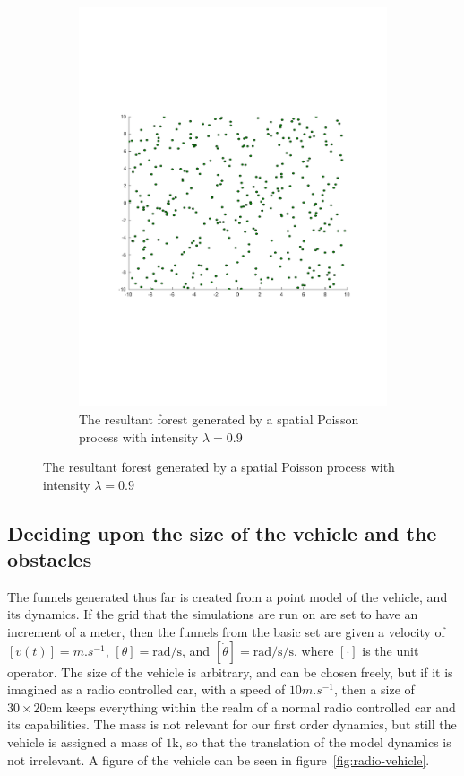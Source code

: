 \begin{figure}
\begin{subfigure}[b]{0.5\textwidth}
    \includegraphics[width=\textwidth]{figures/experiments/poisson09}
    \caption{The resultant forest generated by a spatial Poisson process with
      intensity \(\lambda = 0.9\)}
    \label{fig:poisson09}
  \end{subfigure}
\end{figure}

\subsection{Deciding upon the size of the vehicle and the obstacles}

The funnels generated thus far is created from a point model of the vehicle, and
its dynamics. If the grid that the simulations are run on are set to have an
increment of a meter, then the funnels from the basic set are given a velocity
of \([v(t)] = \si{m.s^{-1}}\), \([\theta] = \si{\radian\per\second}\), and
\([\dot{\theta}] = \si{\radian\per\second\per\second}\), where \([\cdot]\) is
the unit operator. The size of the vehicle is arbitrary, and can be chosen
freely, but if it is imagined as a radio controlled car, with a speed of
\(10\si{m.s^{-1}}\), then a size of \(30 \times 20 \si{\centi\metre} \) keeps
everything within the realm of a normal radio controlled car and its
capabilities. The mass is not relevant for our first order dynamics, but still
the vehicle is assigned a mass of \(1 \si{\kilo}\), so that the translation of
the model dynamics is not irrelevant. A figure of the vehicle can be seen in
figure~\cref{fig:radio-vehicle}.

